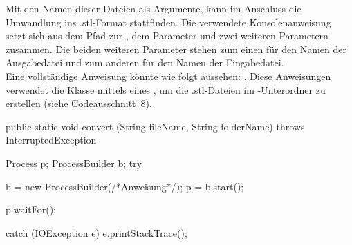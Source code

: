 Mit den Namen dieser Dateien als Argumente, kann im Anschluss die Umwandlung ins .stl-Format stattfinden.
Die verwendete Konsolenanweisung setzt sich aus dem Pfad zur , dem Parameter  und zwei weiteren Parametern zusammen. 
Die beiden weiteren Parameter stehen zum einen für den Namen der Ausgabedatei und zum anderen für den Namen der Eingabedatei. \\
Eine vollständige Anweisung könnte wie folgt aussehen:  .
Diese Anweisungen verwendet die Klasse  mittels eines , um die .stl-Dateien im -Unterordner zu erstellen (siehe Codeausschnitt~8). \\

\begin{code}
	public static void convert (String fileName, String folderName) throws InterruptedException {
		Process p;
		ProcessBuilder b;
		try {
			b = new ProcessBuilder(/*Anweisung*/);
			p = b.start();
						
			p.waitFor();
		} catch (IOException e) {
			e.printStackTrace();
		}
	}
\end{code}